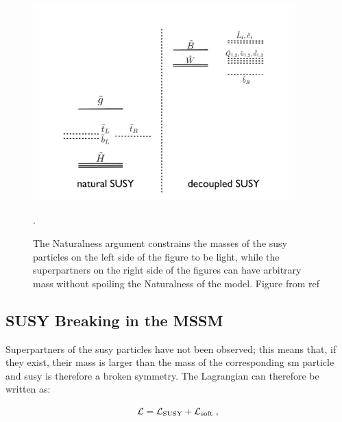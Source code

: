 \begin{figure}[h!]
\begin{center} 
\includegraphics[width=0.9\textwidth]{figures/theory/NaturalSpec.pdf} 
\end{center}
\caption{The Naturalness argument constrains the masses of the \gls{susy} particles on the left side of the figure to be light, while the superpartners on the right side of the figures can have arbitrary mass without spoiling the Naturalness of the model. Figure from ref \cite{Papucci:2011wy}}.
\label{fig:NaturalSpectrum}
\end{figure}


\subsection{SUSY Breaking in the MSSM}

Superpartners of the \gls{susy} particles have not been observed; this means that, if they exist, their mass is larger than the mass of the corresponding \gls{sm} particle and \gls{susy} is therefore a broken symmetry. The Lagrangian can therefore be written as:

\begin{equation}
\mathcal{L} = \mathcal{L}_{\rm SUSY} + \mathcal{L}_{\rm soft} \; ,
\end{equation}

